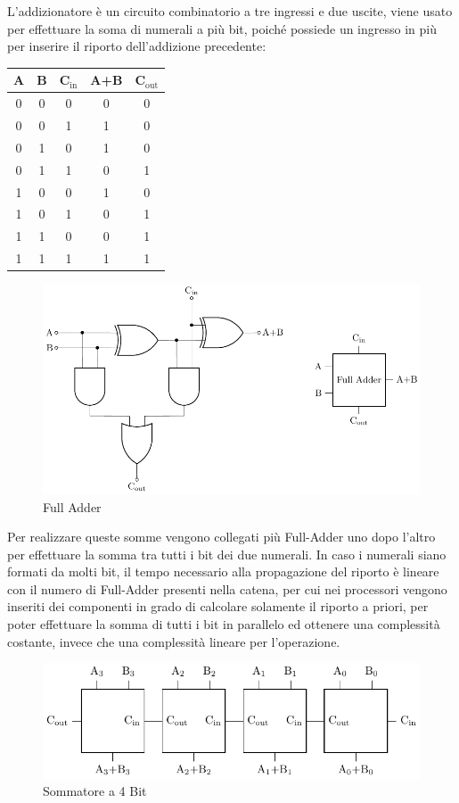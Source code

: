 \documentclass{article}
\numberwithin{equation}{subsection}
\begin{document}
L'addizionatore è un circuito combinatorio a tre ingressi e due uscite, viene usato per effettuare la soma di numerali a più bit, poiché possiede un ingresso in più per inserire il riporto dell'addizione 
precedente: 
\begin{center}
    \begin{tabular}{|c|c||c|c|c|}
        \hline
        A&B&C$_\mathrm{in}$&A+B&C$_\mathrm{out}$\\
        \hline\hline
        0&0&0&0&0\\
        \hline
        0&0&1&1&0\\
        \hline
        0&1&0&1&0\\
        \hline
        0&1&1&0&1\\
        \hline
        1&0&0&1&0\\
        \hline
        1&0&1&0&1\\
        \hline
        1&1&0&0&1\\
        \hline
        1&1&1&1&1\\
        \hline
    \end{tabular}
\end{center}
\begin{figure}[H]%
    \centering%
    \includegraphics{full-adder.pdf}%
    \caption{Full Adder}
\end{figure}
Per realizzare queste somme vengono collegati più Full-Adder uno dopo l'altro per effettuare la somma tra tutti i bit dei due numerali. In caso i numerali siano formati da molti bit, il tempo 
necessario alla propagazione del riporto è lineare con il numero di Full-Adder presenti nella catena, per cui nei processori vengono inseriti dei componenti in grado di calcolare solamente il riporto a priori, per 
poter effettuare la somma di tutti i bit in parallelo ed ottenere una complessità costante, invece che una complessità lineare per l'operazione. 
\begin{figure}[H]%
    \centering%
    \includegraphics{sommatore-4-bit.pdf}%
    \caption{Sommatore a 4 Bit}%
\end{figure}
\end{document}
